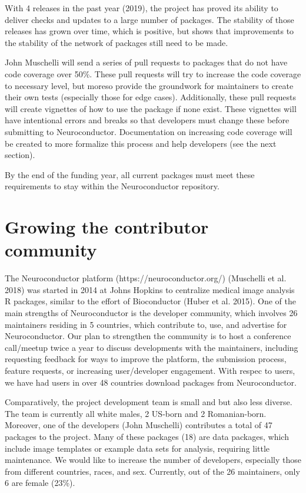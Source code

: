 \documentclass[]{elsarticle} %
\begin{document}
With 4 releases in the past year (2019), the project has proved its ability to deliver checks and updates to a large number of packages. The stability of those releases has grown over time, which is positive, but shows that improvements to the stability of the network of packages still need to be made.

John Muschelli will send a series of pull requests to packages that do not have code coverage over 50\%. These pull requests will try to increase the code coverage to necessary level, but moreso provide the groundwork for maintainers to create their own tests (especially those for edge cases). Additionally, these pull requests will create vignettes of how to use the package if none exist. These vignettes will have intentional errors and breaks so that developers must change these before submitting to Neuroconductor. Documentation on increasing code coverage will be created to more formalize this process and help developers (see the next section).

By the end of the funding year, all current packages must meet these requirements to stay within the Neuroconductor repository.

\hypertarget{growing-the-contributor-community}{%
\section{Growing the contributor community}\label{growing-the-contributor-community}}

The Neuroconductor platform (https://neuroconductor.org/) (Muschelli et al. 2018) was started in 2014 at Johns Hopkins to centralize medical image analysis R packages, similar to the effort of Bioconductor (Huber et al. 2015). One of the main strengths of Neuroconductor is the developer community, which involves 26 maintainers residing in 5 countries, which contribute to, use, and advertise for Neuroconductor. Our plan to strengthen the community is to host a conference call/meetup twice a year to discuss developments with the maintainers, including requesting feedback for ways to improve the platform, the submission process, feature requests, or increasing user/developer engagement. With respec to users, we have had users in over 48 countries download packages from Neuroconductor.

Comparatively, the project development team is small and but also less diverse. The team is currently all white males, 2 US-born and 2 Romanian-born. Moreover, one of the developers (John Muschelli) contributes a total of 47 packages to the project. Many of these packages (18) are data packages, which include image templates or example data sets for analysis, requiring little maintenance. We would like to increase the number of developers, especially those from different countries, races, and sex. Currently, out of the 26 maintainers, only 6 are female (23\%).
\end{document}
